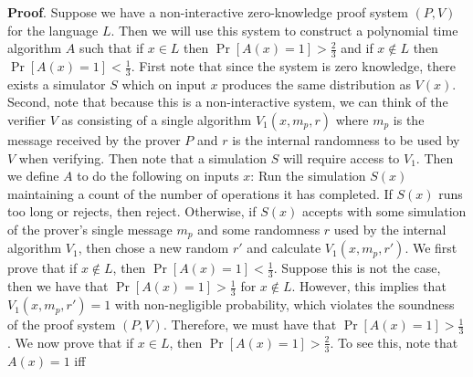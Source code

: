 \documentclass{article}
\begin{document}
\begin{enumerate}[,start=3]
\begin{mdbmarginx}{1ex}{0pt}{1ex}{0pt}%
\noindent{}\textbf{Proof}.  Suppose we have a non-interactive zero-knowledge proof system $(P,V)$ for the language $L$. Then
we will use this system to construct a polynomial time algorithm $A$ such that if $x \in L$ then
$\Pr[A(x) = 1] > \frac{2}{3}$ and if $x \notin L$ then $\Pr[A(x) = 1 ] < \frac{1}{3}$. First note that
since the system is zero knowledge, there exists a simulator $S$ which on input $x$ produces the
same distribution as $V(x)$. Second, note that because this is a non-interactive system, we can
think of the verifier $V$ as consisting of a single algorithm $V_1(x,m_p,r)$ where $m_p$ is the
message received by the prover $P$ and $r$ is the internal randomness to be used by $V$ when
verifying. Then note that a simulation $S$ will require access to $V_1$. 
Then we define $A$ to do the following on inputs $x$: Run the simulation
$S(x)$ maintaining a count of the number of operations it has completed. If $S(x)$ runs too long
or rejects, then reject. Otherwise, if $S(x)$ accepts with some simulation of the prover's single 
message $m_p$ and some randomness $r$ used by the internal algorithm $V_1$, then chose a new random 
$r'$ and calculate $V_1(x,m_p, r')$. We first prove that if $x \notin L$, then $\Pr[A(x) = 1]< \frac{1}{3}$.
Suppose this is not the case, then we have that $\Pr[A(x) = 1] > \frac{1}{3}$ for $x \notin L$. However,
this implies that $V_1(x,m_p,r') = 1$ with non-negligible probability, which violates the soundness
of the proof system $(P,V)$. Therefore, we must have that $\Pr[A(x) = 1] > \frac{1}{3}$. We now prove
that if $x \in L$, then $\Pr[A(x) = 1] > \frac{2}{3}$. To see this, note that $A(x) = 1$ iff 

\end{mdbmarginx}
\end{enumerate}
\end{document}
